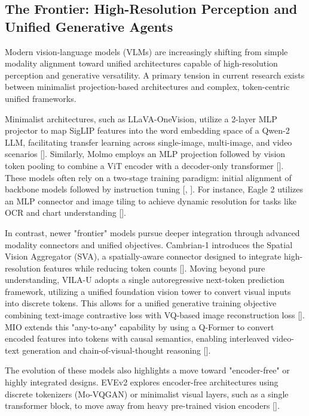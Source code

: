 \documentclass[11pt]{article}
\begin{document}
\subsection{The Frontier: High-Resolution Perception and Unified Generative Agents}

Modern vision-language models (VLMs) are increasingly shifting from simple modality alignment toward unified architectures capable of high-resolution perception and generative versatility. A primary tension in current research exists between minimalist projection-based architectures and complex, token-centric unified frameworks.

Minimalist architectures, such as LLaVA-OneVision, utilize a 2-layer MLP projector to map SigLIP features into the word embedding space of a Qwen-2 LLM, facilitating transfer learning across single-image, multi-image, and video scenarios [\citep{2408.03326}]. Similarly, Molmo employs an MLP projection followed by vision token pooling to combine a ViT encoder with a decoder-only transformer [\citep{2409.17146}]. These models often rely on a two-stage training paradigm: initial alignment of backbone models followed by instruction tuning [\citep{2408.12637}, \citep{2501.05952}]. For instance, Eagle 2 utilizes an MLP connector and image tiling to achieve dynamic resolution for tasks like OCR and chart understanding [\citep{2501.14818}].

In contrast, newer "frontier" models pursue deeper integration through advanced modality connectors and unified objectives. Cambrian-1 introduces the Spatial Vision Aggregator (SVA), a spatially-aware connector designed to integrate high-resolution features while reducing token counts [\citep{2406.16860}]. Moving beyond pure understanding, VILA-U adopts a single autoregressive next-token prediction framework, utilizing a unified foundation vision tower to convert visual inputs into discrete tokens. This allows for a unified generative training objective combining text-image contrastive loss with VQ-based image reconstruction loss [\citep{2409.04429}]. MIO extends this "any-to-any" capability by using a Q-Former to convert encoded features into tokens with causal semantics, enabling interleaved video-text generation and chain-of-visual-thought reasoning [\citep{2409.17146}].

The evolution of these models also highlights a move toward "encoder-free" or highly integrated designs. EVEv2 explores encoder-free architectures using discrete tokenizers (Mo-VQGAN) or minimalist visual layers, such as a single transformer block, to move away from heavy pre-trained vision encoders [\citep{2502.06788}].
\end{document}
